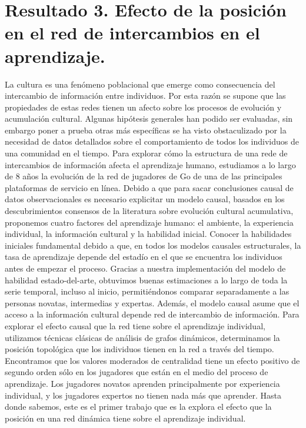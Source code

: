 \documentclass[a4paper,11pt]{book}
\theoremstyle{definition}
\begin{document}
\chapter{Resultado 3. Efecto de la posición en el red de intercambios en el aprendizaje.}\label{ch:topo}

La cultura es una fenómeno poblacional que emerge como consecuencia del intercambio de información entre individuos.
%
Por esta razón se supone que las propiedades de estas redes tienen un afecto sobre los procesos de evolución y acumulación cultural.%
%
Algunas hipótesis generales han podido ser evaluadas, sin embargo poner a prueba otras más específicas se ha visto obstaculizado por la necesidad de datos detallados sobre el comportamiento de todos los individuos de una comunidad en el tiempo.
%
Para explorar cómo la estructura de una rede de intercambios de información afecta el aprendizaje humano, estudiamos a lo largo de 8 años la evolución de la red de jugadores de Go de una de las principales plataformas de servicio en línea.
%
Debido a que para sacar conclusiones causal de datos observacionales es necesario explicitar un modelo causal, basados en los descubrimientos consensos de la literatura sobre evolución cultural acumulativa, proponemos cuatro factores del aprendizaje humano: el ambiente, la experiencia individual, la información cultural y la habilidad inicial.
%
Conocer la habilidades iniciales fundamental debido a que, en todos los modelos causales estructurales, la tasa de aprendizaje depende del estadío en el que se encuentra los individuos antes de empezar el proceso.
%
Gracias a nuestra implementación del modelo de habilidad estado-del-arte, obtuvimos buenas estimaciones a lo largo de toda la serie temporal, incluso al inicio, permitiéndonos comparar separadamente a las personas novatas, intermedias y expertas.
%
Además, el modelo causal asume que el acceso a la información cultural depende red de intercambio de información.
%
Para explorar el efecto causal que la red tiene sobre el aprendizaje individual, utilizamos técnicas clásicas de análisis de grafos dinámicos, determinamos la posición topológica que los individuos tienen en la red a través del tiempo.
%
Encontramos que los valores moderados de centralidad tiene un efecto positivo de segundo orden sólo en los jugadores que están en el medio del proceso de aprendizaje.
%
Los jugadores novatos aprenden principalmente por experiencia individual, y los jugadores expertos no tienen nada más que aprender.
%
Hasta donde sabemos, este es el primer trabajo que es la explora el efecto que la posición en una red dinámica tiene sobre el aprendizaje individual.
\end{document}
